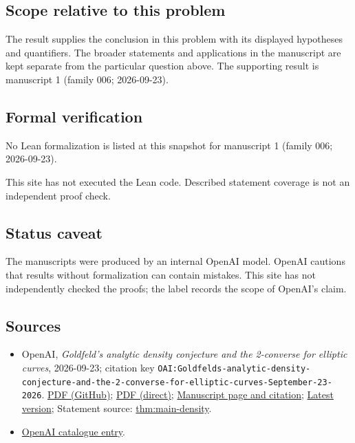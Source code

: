 \documentclass[11pt]{article}
\begin{document}
\subsection{Scope relative to this problem}
The result supplies the conclusion in this problem with its displayed hypotheses and quantifiers. The broader statements and applications in the manuscript are kept separate from the particular question above. The supporting result is manuscript 1 (family 006; 2026-09-23).

\subsection{Formal verification}
No Lean formalization is listed at this snapshot for manuscript 1 (family 006; 2026-09-23).

This site has not executed the Lean code. Described statement coverage is not an independent proof check.

\subsection{Status caveat}
The manuscripts were produced by an internal OpenAI model. OpenAI cautions that results without formalization can contain mistakes. This site has not independently checked the proofs; the label records the scope of OpenAI's claim.

\subsection{Sources}
\begin{itemize}
\item OpenAI, \emph{Goldfeld's analytic density conjecture and the 2-converse for elliptic curves}, 2026-09-23; citation key \texttt{OAI:Goldfelds-analytic-density-conjecture-and-the-2-converse-for-elliptic-curves-September-23-2026}. \href{https://github.com/openai/math/blob/adc7f1241b42e322a6451854ab7e4b4c146bf78a/preprints/Goldfelds-analytic-density-conjecture-and-the-2-converse-for-elliptic-curves-September-23-2026/paper.pdf}{PDF (GitHub)}; \href{https://github.com/openai/math/raw/adc7f1241b42e322a6451854ab7e4b4c146bf78a/preprints/Goldfelds-analytic-density-conjecture-and-the-2-converse-for-elliptic-curves-September-23-2026/paper.pdf}{PDF (direct)}; \href{https://github.com/openai/math/blob/adc7f1241b42e322a6451854ab7e4b4c146bf78a/preprints/Goldfelds-analytic-density-conjecture-and-the-2-converse-for-elliptic-curves-September-23-2026/README.md}{Manuscript page and citation}; \href{https://github.com/openai/math/blob/main/preprints/Goldfelds-analytic-density-conjecture-and-the-2-converse-for-elliptic-curves-September-23-2026/paper.pdf}{Latest version}; Statement source: \href{https://github.com/openai/math/blob/adc7f1241b42e322a6451854ab7e4b4c146bf78a/preprints/Goldfelds-analytic-density-conjecture-and-the-2-converse-for-elliptic-curves-September-23-2026/build/sections/00-introduction.tex\#L35}{thm:main-density}.
\item \href{https://github.com/openai/math/blob/adc7f1241b42e322a6451854ab7e4b4c146bf78a/CONTENTS.md}{OpenAI catalogue entry}.
\end{itemize}
\end{document}
